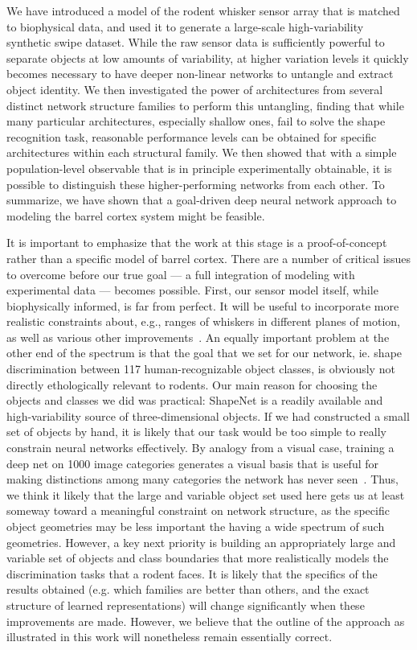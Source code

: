 We have introduced a model of the rodent whisker sensor array that is matched to biophysical data, and used it to generate a large-scale high-variability synthetic swipe dataset. 
While the raw sensor data is sufficiently powerful to separate objects at low amounts of variability, at higher variation levels it quickly becomes necessary to have deeper non-linear networks to untangle and extract object identity. 
We then investigated the power of architectures from several distinct network structure families to perform this untangling, finding that while many particular architectures, especially shallow ones, fail to solve the shape recognition task, reasonable performance levels can be obtained for specific architectures within each structural family.
We then showed that with a simple population-level observable that is in principle experimentally obtainable, it is possible to distinguish these higher-performing networks from each other. 
To summarize, we have shown that a goal-driven deep neural network approach to modeling the barrel cortex system might be feasible. 

It is important to emphasize that the work at this stage is a proof-of-concept rather than a specific model of barrel cortex.  
There are a number of critical issues to overcome before our true goal --- a full integration of modeling with experimental data --- becomes possible.    
First, our sensor model itself, while biophysically informed, is far from perfect. 
It will be useful to incorporate more realistic constraints about, e.g., ranges of whiskers in different planes of motion, as well as various other improvements~\cite{Quist2014, Huet2016}.
An equally important problem at the other end of the spectrum is that the goal that we set for our network, ie. shape discrimination between 117 human-recognizable object classes, is obviously not directly ethologically relevant to rodents. 
Our main reason for choosing the objects and classes we did was practical: ShapeNet is a readily available and high-variability source of three-dimensional objects. 
If we had constructed a small set of objects by hand, it is likely that our task would be too simple to really constrain neural networks effectively. 
By analogy from a visual case, training a deep net on 1000 image categories generates a visual basis that is useful for making distinctions among many categories the network has never seen~\cite{cadieu2014deep}.  
Thus, we think it likely that the large and variable object set used here gets us at least someway toward a meaningful constraint on network structure, as the specific object geometries may be less important the having a wide spectrum of such geometries. 
However, a key next priority is building an appropriately large and variable set of objects and class boundaries that more realistically models the discrimination tasks that a rodent faces.
It is likely that the specifics of the results obtained (e.g. which families are better than others, and the exact structure of learned representations) will change significantly when these improvements are made.  
However, we believe that the outline of the approach as illustrated in this work will nonetheless remain essentially correct. 

